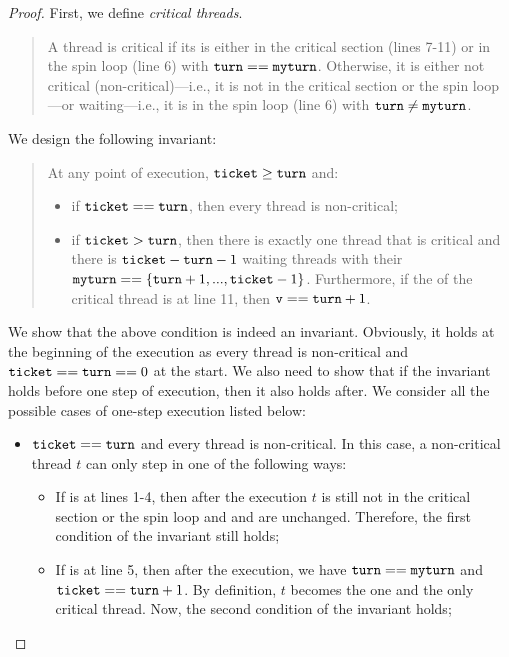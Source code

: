 \documentclass{article}[10pt]
\begin{document}
\begin{proof}
  First, we define \emph{critical threads}. 
  \begin{quote}
    A thread is critical if its  is either in the critical
    section (lines 7-11) or in the spin loop (line 6) with $\text{\ttfamily turn} ==
    \text{\ttfamily myturn}$. Otherwise, it is either not critical
    (non-critical)---i.e., it is not in the critical section or the
    spin loop---or waiting---i.e., it is in the spin loop (line 6)
    with $\text{\ttfamily turn} \not= \text{\ttfamily myturn}$.
  \end{quote}
  We design the following invariant:
  \begin{quote}
    At any point of execution, $\text{\ttfamily ticket} \geq \text{\ttfamily turn}$ and:
    \begin{itemize}
    \item if $\text{\ttfamily ticket} == \text{\ttfamily turn}$, then every thread is non-critical;
    \item if $\text{\ttfamily ticket} > \text{\ttfamily turn}$, then there is exactly one thread
      that is critical and there is $\text{\ttfamily ticket} - \text{\ttfamily turn} - 1$ waiting
      threads with their $\text{\ttfamily myturn} == \{\text{\ttfamily turn}+1,...,\text{\ttfamily ticket} - 1\}$.
      Furthermore, if the  of the critical thread is at line
      11, then $\text{\ttfamily v} == \text{\ttfamily turn} + 1$. 
    \end{itemize}
  \end{quote}
  We show that the above condition is indeed an
  invariant. Obviously, it holds at the beginning of the execution as
  every thread is non-critical and $\text{\ttfamily ticket} == \text{\ttfamily turn} == 0$ at the
  start. We also need to show that if the invariant holds before one
  step of execution, then it also holds after. We consider all the
  possible cases of one-step execution listed below:
  \begin{itemize}
  \item $\text{\ttfamily ticket} == \text{\ttfamily turn}$ and every thread is non-critical. In this
    case, a non-critical thread $t$ can only step in one of the
    following ways:
    \begin{itemize}
    \item If  is at lines 1-4, then after the execution $t$ is
      still not in the critical section or the spin loop and \kticket
      and \kturn are unchanged. Therefore, the first condition of the
      invariant still holds;

    \item If  is at line 5, then after the execution, we have
      $\text{\ttfamily turn} == \text{\ttfamily myturn}$ and $\text{\ttfamily ticket} == \text{\ttfamily turn} + 1$. By
      definition, $t$ becomes the one and the only critical
      thread. Now, the second condition of the invariant holds;


\end{itemize}
\end{itemize}
\end{proof}
\end{document}
